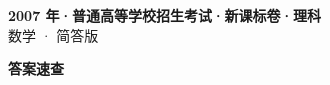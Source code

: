 \documentclass[zihao=-4, a4paper]{ctexart}
\begin{document}
\begin{center}
  {\Large\bfseries 2007 年·普通高等学校招生考试·新课标卷·理科}\\[4pt]
  {\large 数学 · 简答版}
\end{center}
\medskip
{}

\clearpage
{}
\begin{center}{\Large\bfseries 答案速查}\end{center}
\medskip

\end{document}
